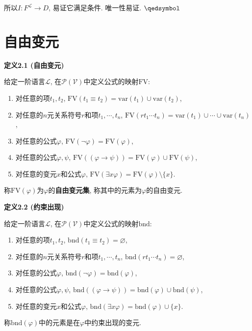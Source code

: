 \documentclass[UTF8]{ctexart}
\begin{document}
所以$I:F^{\mathcal{L}}\to D$, 易证它满足条件. 唯一性易证. \hfill $\qedsymbol$





\newpage
\section{自由变元}

\hypertarget{sec:定义2.1}{}
\noindent\textbf{定义2.1 (自由变元)}

给定一阶语言$\mathcal{L}$, 在$\mathcal{P}(\mathcal{V})$中定义公式的映射$\mathrm{FV}$:
\begin{enumerate}
    \item 对任意的项$t_1,t_2$,
    $\mathrm{FV}(t_1\equiv t_2)=\mathrm{var}(t_1)\cup\mathrm{var}(t_2)$,
    \item 对任意的$n$元关系符号$r$和项$t_1,\cdots,t_n$,
    $\mathrm{FV}(rt_1\cdots t_n)=\mathrm{var}(t_1)\cup\cdots\cup\mathrm{var}(t_n)$,
    \item 对任意的公式$\varphi$,
    $\mathrm{FV}(\neg\varphi)=\mathrm{FV}(\varphi)$,
    \item 对任意的公式$\varphi,\psi$,
    $\mathrm{FV}((\varphi\to\psi))=\mathrm{FV}(\varphi)\cup\mathrm{FV}(\psi)$,
    \item 对任意的变元$x$和公式$\varphi$,
    $\mathrm{FV}(\exists x\varphi)=\mathrm{FV}(\varphi)\setminus\{x\}$.
\end{enumerate}
称$\mathrm{FV}(\varphi)$为$\varphi$的\textbf{自由变元集},
称其中的元素为$\varphi$的自由变元.

\vspace{10pt}

\hypertarget{sec:定义2.2}{}
\noindent\textbf{定义2.2 (约束出现)}

给定一阶语言$\mathcal{L}$, 在$\mathcal{P}(\mathcal{V})$中定义公式的映射$\mathrm{bnd}$:
\begin{enumerate}
    \item 对任意的项$t_1,t_2$,
    $\mathrm{bnd}(t_1\equiv t_2)=\varnothing$,
    \item 对任意的$n$元关系符号$r$和项$t_1,\cdots,t_n$,
    $\mathrm{bnd}(rt_1\cdots t_n)=\varnothing$,
    \item 对任意的公式$\varphi$,
    $\mathrm{bnd}(\neg\varphi)=\mathrm{bnd}(\varphi)$,
    \item 对任意的公式$\varphi,\psi$,
    $\mathrm{bnd}((\varphi\to\psi))=\mathrm{bnd}(\varphi)\cup\mathrm{bnd}(\psi)$,
    \item 对任意的变元$x$和公式$\varphi$,
    $\mathrm{bnd}(\exists x\varphi)=\mathrm{bnd}(\varphi)\cup\{x\}$.
\end{enumerate}
称$\mathrm{bnd}(\varphi)$中的元素是在$\varphi$中约束出现的变元.
\end{document}
